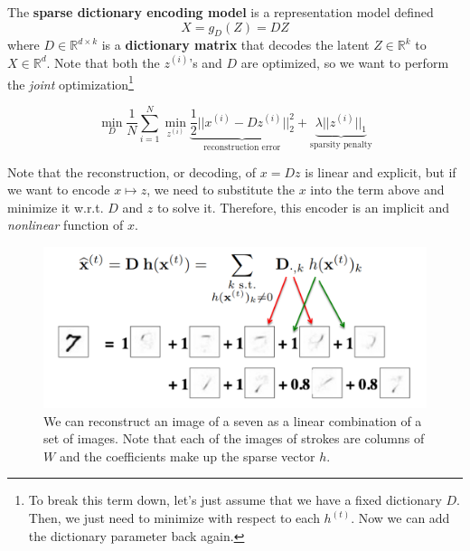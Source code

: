 \documentclass{article}
\begin{document}
  \begin{definition}
    The \textbf{sparse dictionary encoding model} is a representation model defined 
    \begin{equation}
      X = g_{D}(Z) = D Z
    \end{equation}
    where $D \in \mathbb{R}^{d \times k}$ is a \textbf{dictionary matrix} that decodes the latent $Z \in \mathbb{R}^k$ to $X \in \mathbb{R}^d$. Note that both the $z^{(i)}$'s and $D$ are optimized, so we want to perform the \textit{joint} optimization\footnote{To break this term down, let's just assume that we have a fixed dictionary $D$. Then, we just need to minimize with respect to each $h^{(t)}$. Now we can add the dictionary parameter back again. }

    \begin{equation}
      \min_{D} \frac{1}{N} \sum_{i=1}^N \min_{z^{(i)}} \underbrace{\frac{1}{2} ||x^{(i)} - D z^{(i)}||_2^2}_{\text{reconstruction error}} + \underbrace{\lambda ||z^{(i)}||_1}_{\text{sparsity penalty}}
    \end{equation}
  \end{definition}

  Note that the reconstruction, or decoding, of $x = Dz$ is linear and explicit, but if we want to encode $x \mapsto z$, we need to substitute the $x$ into the term above and minimize it w.r.t. $D$ and $z$ to solve it. Therefore, this encoder is an implicit and \textit{nonlinear} function of $x$. 

  \begin{figure}[H]
    \centering 
    \includegraphics[scale=0.4]{img/sparse_coding.png}
    \caption{We can reconstruct an image of a seven as a linear combination of a set of images. Note that each of the images of strokes are columns of $W$ and the coefficients make up the sparse vector $h$. } 
    \label{fig:sparse_coding}
  \end{figure}
\end{document}
